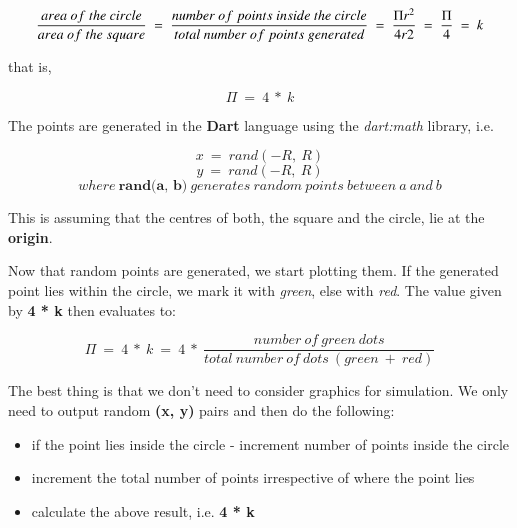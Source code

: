 \documentclass{resonance}
\begin{document}
$$\frac{area\ of\ the\ circle}{area\ of\ the\ square}\ =\ \frac{number\ of\ points\ inside\ the\ circle}{total\ number\ of\ points\ generated}\ =\ \frac{\Pi r\textsuperscript{2}}{4r2}\ =\ \frac{\Pi}{4}\ =\ k$$

that is,


$$\Pi\ =\ 4\ *\ k$$

The points are generated in the \textbf{Dart} language using the \textit{dart:math} library, i.e.

$$x\ =\ rand(-R,\ R)$$
$$y\ =\ rand(-R,\ R)$$
$$where\ \textbf{rand(a,\ b)}\ generates\ random\ points\ between\ a\ and\ b$$

This is assuming that the centres of both, the square and the circle, lie at the \textbf{origin}.

Now that random points are generated, we start plotting them. If the generated point lies within the circle, we mark it with \textit{green}, else with \textit{red}. The value given by \textbf{4 * k} then evaluates to:

$$\Pi\ =\ 4\ *\ k\ =\ 4\ *\ \frac{number\ of\ green\ dots}{total\ number\ of\ dots\ (green\ +\ red)}$$

The best thing is that we don’t need to consider graphics for simulation. We only need to output random \textbf{(x, y)} pairs and then do the following:

\begin{itemize}
    \item if the point lies inside the circle - increment number of points inside the circle
    \item increment the total number of points irrespective of where the point lies
    \item calculate the above result, i.e. \textbf{4 * k}
\end{itemize}
\end{document}
